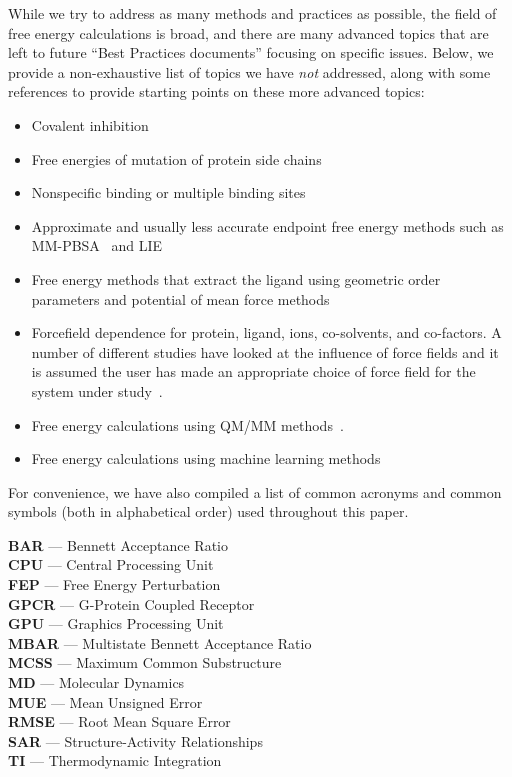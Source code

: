 \documentclass[9pt,bestpractices]{livecoms}
\begin{document}
While we try to address as many methods and practices as possible, the field of free energy calculations is broad, and there are many advanced topics that are left to future ``Best Practices documents'' focusing on specific issues. 
Below, we provide a non-exhaustive list of topics we have \emph{not} addressed, along with some references to provide starting points on these more advanced topics:
\begin{itemize}
\item Covalent inhibition~\cite{lameira2019predicting}
\item Free energies of mutation of protein side chains~\cite{gapsys2016accurate,aldeghi2018accurate}
\item Nonspecific binding or multiple binding sites~\cite{gill2018binding}
\item Approximate and usually less accurate endpoint free energy methods such as MM-PBSA~\cite{genheden2015mm} and LIE~\cite{gutierrez-de-teran2012linear}
\item Free energy methods that extract the ligand using geometric order parameters and potential of mean force methods~\cite{heinzelmann2017attachpullrelease}
\item Forcefield dependence for protein, ligand, ions, co-solvents, and co-factors. A number of different studies have looked at the influence of force fields and it is assumed the user has made an appropriate choice of force field for the system under study~\cite{loeffler2018reproducibility, vassetti2019assessment, lopes2015current, hahn2024current}. 
\item Free energy calculations using QM/MM methods~\cite{beierlein2011simple,dybeck2016comparison,cave-ayland2015direct,Schoeller2023}.
\item Free energy calculations using machine learning methods~\cite{rufa2020chemical, scheen2020hybrid, cole2020machine,Karwounopoulos2024}
\end{itemize}

For convenience, we have also compiled a list of common acronyms and common symbols (both in alphabetical order) used throughout this paper.
\begin{tcolorbox}[title=Acronyms, colback=blue!10!white]
    {\bf BAR} --- Bennett Acceptance Ratio\\
    {\bf CPU} --- Central Processing Unit\\
     {\bf FEP} --- Free Energy Perturbation\\
     {\bf GPCR} --- G-Protein Coupled Receptor\\
     {\bf GPU} --- Graphics Processing Unit\\
     {\bf MBAR} --- Multistate Bennett Acceptance Ratio\\
     {\bf MCSS} --- Maximum Common Substructure\\
     {\bf MD} --- Molecular Dynamics\\
     {\bf MUE} --- Mean Unsigned Error\\
     {\bf RMSE} --- Root Mean Square Error\\
     {\bf SAR} --- Structure-Activity Relationships\\
     {\bf TI} --- Thermodynamic Integration
\end{tcolorbox}
\end{document}
